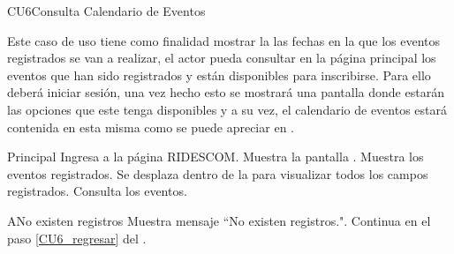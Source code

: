\begin{UseCase}{CU6}{Consulta Calendario de Eventos}{
		\noindent Este caso de uso tiene como finalidad mostrar la las fechas en la que los eventos registrados se van a realizar, el actor pueda consultar en la página principal los eventos que han sido registrados y están disponibles para inscribirse. 
		Para ello deberá iniciar sesión, una vez hecho esto se mostrará una pantalla  donde estarán las opciones que este tenga disponibles y a su vez, el calendario de eventos estará contenida en esta misma como se puede apreciar en .
        
	} \label{CU6_evento}
		\end{UseCase}
	\pagebreak
	
    \begin{UCtrayectoria}{Principal}
    \UCpaso[\UCactor] Ingresa a la página RIDESCOM.
    \UCpaso Muestra la pantalla .
    \UCpaso Muestra los eventos registrados.   \label{CU6_regresar}
    \UCpaso[\UCactor] Se desplaza dentro de la  para visualizar todos los campos registrados.
	\UCpaso[\UCactor] Consulta los eventos. 
    \end{UCtrayectoria}

	\begin{UCtrayectoriaA}{A}{No existen registros}
		\UCpaso Muestra mensaje “No existen registros.".
		\UCpaso Continua en el paso \ref{CU6_regresar} del .
	\end{UCtrayectoriaA}
    

	



